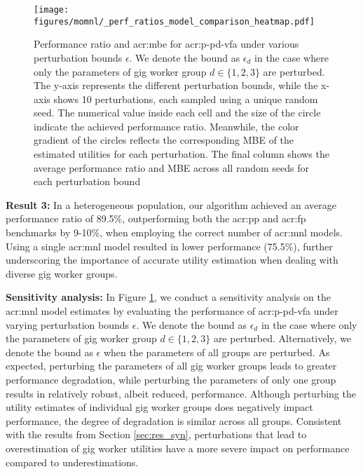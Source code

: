 \begin{figure}[t!]%
    \centering
    \fontsize{10}{10}\selectfont
    \texttt{[image: figures/momnl/\_perf\_ratios\_model\_comparison\_heatmap.pdf]}%
    \caption{\textnormal{Performance ratio and \gls{acr:mbe} for \gls{acr:p-pd-vfa} under various perturbation bounds $\epsilon$.  We denote the bound as $\epsilon_d$ in the case where only the parameters of gig worker group $d \in \{1,2,3\}$ are perturbed. The y-axis represents the different perturbation bounds, while the x-axis shows 10 perturbations, each sampled using a unique random seed. The numerical value inside each cell and the size of the circle indicate the achieved performance ratio. Meanwhile, the color gradient of the circles reflects the corresponding MBE of the estimated utilities for each perturbation. The final column shows the average performance ratio and MBE across all random seeds for each perturbation bound}}
    \label{fig:sens_syn_2}%
\end{figure}

\noindent \textbf{Result 3:} In a heterogeneous population, our algorithm achieved an average performance ratio of 89.5\%, outperforming both the \gls{acr:pp} and \gls{acr:fp} benchmarks by 9-10\%, when employing the correct number of \gls{acr:mnl} models. Using a single \gls{acr:mnl} model resulted in lower performance (75.5\%), further underscoring the importance of accurate utility estimation when dealing with diverse gig worker groups. 

\noindent \textbf{Sensitivity analysis:} In Figure \ref{fig:sens_syn_2}, we conduct a sensitivity analysis on the \gls{acr:mnl} model estimates by evaluating the performance of \gls{acr:p-pd-vfa} under varying perturbation bounds $\epsilon$. We denote the bound as $\epsilon_d$ in the case where only the parameters of gig worker group $d \in \{1,2,3\}$ are perturbed. Alternatively, we denote the bound as $\epsilon$ when the parameters of all groups are perturbed. As expected, perturbing the parameters of all gig worker groups leads to greater performance degradation, while perturbing the parameters of only one group results in relatively robust, albeit reduced, performance. Although perturbing the utility estimates of individual gig worker groups does negatively impact performance, the degree of degradation is similar across all groups. Consistent with the results from Section \ref{sec:res_syn}, perturbations that lead to overestimation of gig worker utilities have a more severe impact on performance compared to underestimations.


